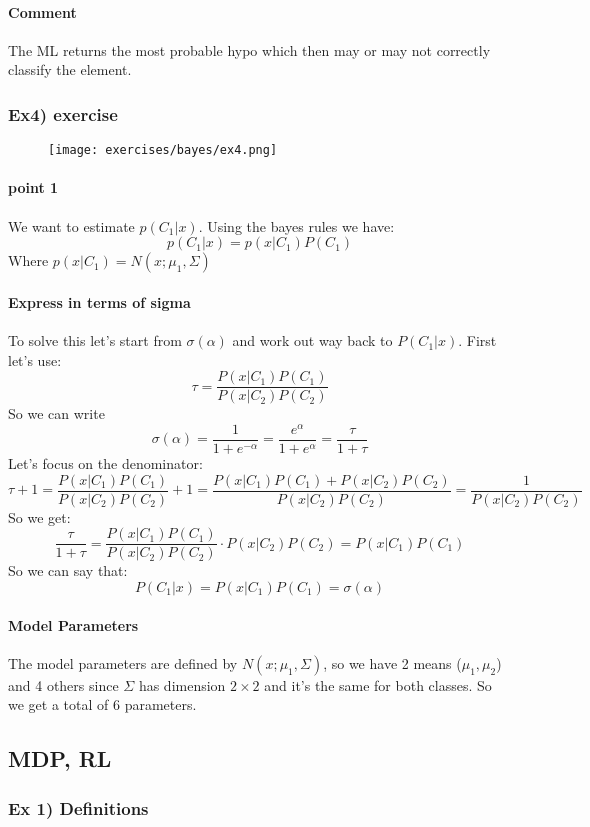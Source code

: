 \paragraph{Comment}
The ML returns the most probable hypo which then may or may not correctly classify the element.

\subsubsection{Ex4) exercise}
\begin{figure}[H]
    \centering
    \texttt{[image: exercises/bayes/ex4.png]}
\end{figure}

\paragraph{point 1}
We want to estimate $p(C_1|x)$. Using the bayes rules we have:
$$p(C_1|x)=p(x|C_1)P(C_1)$$
Where $p(x|C_1)=N(x;\mu_1, \Sigma)$

\paragraph{Express in terms of sigma}
To solve this let's start from $\sigma(\alpha)$ and work out way back to $P(C_1|x)$. First let's use:
$$\tau=\frac{P(x|C_1)P(C_1)}{P(x|C_2)P(C_2)}$$
So we can write
$$\sigma(\alpha)=\frac{1}{1+e^{-\alpha}}=\frac{e^{\alpha}}{1+e^{\alpha}}=\frac{\tau}{1+\tau}$$
Let's focus on the denominator:
$$\tau+1=\frac{P(x|C_1)P(C_1)}{P(x|C_2)P(C_2)}+1=\frac{P(x|C_1)P(C_1)+P(x|C_2)P(C_2)}{P(x|C_2)P(C_2)}=\frac{1}{P(x|C_2)P(C_2)}$$
So we get:
$$\frac{\tau}{1+\tau}=\frac{P(x|C_1)P(C_1)}{P(x|C_2)P(C_2)}\cdot P(x|C_2)P(C_2)=P(x|C_1)P(C_1)$$
So we can say that:
$$P(C_1|x)=P(x|C_1)P(C_1)=\sigma(\alpha)$$

\paragraph{Model Parameters}
The model parameters are defined by $N(x;\mu_1, \Sigma)$, so we have 2 means ($\mu_1,\mu_2$) and 4 others since $\Sigma$ has dimension $2 \times 2$ and it's the same for both classes. So we get a total of 6 parameters.

\subsection{MDP, RL}
\subsubsection{Ex 1) Definitions}

